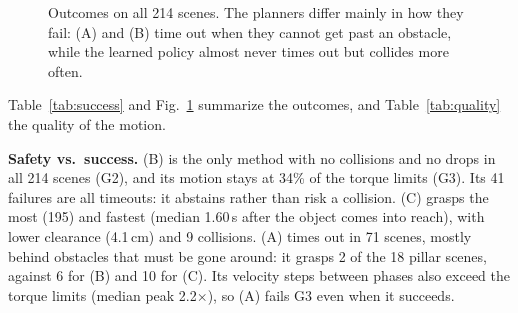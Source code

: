 \documentclass[conference]{IEEEtran}
\begin{document}
\begin{figure}[t]
  \centering
  \caption{Outcomes on all 214 scenes. The planners differ mainly in how they fail: (A) and (B) time out
  when they cannot get past an obstacle, while the learned policy almost never times out but collides
  more often.}
  \label{fig:outcomes}
\end{figure}

Table~\ref{tab:success} and Fig.~\ref{fig:outcomes} summarize the outcomes, and
Table~\ref{tab:quality} the quality of the motion.

\textbf{Safety vs.\ success.} (B) is the only method with no collisions and no drops in all 214 scenes
(G2), and its motion stays at 34\% of the torque limits (G3). Its 41 failures are all timeouts: it
abstains rather than risk a collision. (C) grasps the most (195) and fastest (median 1.60\,s after the
object comes into reach), with lower clearance (4.1\,cm) and 9 collisions. (A) times out in 71 scenes,
mostly behind obstacles that must be gone around: it grasps 2 of the 18 pillar scenes, against 6 for (B)
and 10 for (C). Its velocity steps between phases also exceed the torque limits (median peak 2.2$\times$),
so (A) fails G3 even when it succeeds.
\end{document}
